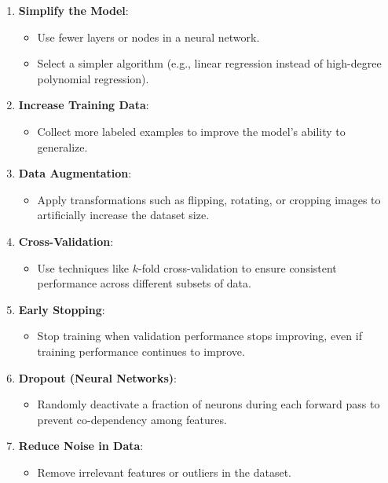 \documentclass[11pt, english]{article}
\begin{document}
\begin{enumerate}
    \item \textbf{Simplify the Model}:
    \begin{itemize}
        \item Use fewer layers or nodes in a neural network.
        \item Select a simpler algorithm (e.g., linear regression instead of high-degree polynomial regression).
    \end{itemize}
    \item \textbf{Increase Training Data}:
    \begin{itemize}
        \item Collect more labeled examples to improve the model's ability to generalize.
    \end{itemize}
    \item \textbf{Data Augmentation}:
    \begin{itemize}
        \item Apply transformations such as flipping, rotating, or cropping images to artificially increase the dataset size.
    \end{itemize}
    \item \textbf{Cross-Validation}:
    \begin{itemize}
        \item Use techniques like $k$-fold cross-validation to ensure consistent performance across different subsets of data.
    \end{itemize}
    \item \textbf{Early Stopping}:
    \begin{itemize}
        \item Stop training when validation performance stops improving, even if training performance continues to improve.
    \end{itemize}
    \item \textbf{Dropout (Neural Networks)}:
    \begin{itemize}
        \item Randomly deactivate a fraction of neurons during each forward pass to prevent co-dependency among features.
    \end{itemize}
    \item \textbf{Reduce Noise in Data}:
    \begin{itemize}
        \item Remove irrelevant features or outliers in the dataset.
    \end{itemize}
\end{enumerate}
\end{document}
